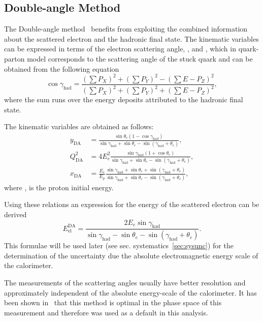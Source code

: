 \subsection{Double-angle Method}
\label{subsec:da}
The Double-angle method~\cite{proc:hera:1991:23} benefits from exploiting the combined information about the scattered electron and the hadronic final state. The kinematic variables can be expressed in terms of the electron scattering angle, \thetae, and \gamha, which in quark-parton model corresponds to the scattering angle of the stuck quark and can be obtained from the following equation
\begin{equation}
\cos \gamma_{\text{had}} = \frac{ \left( \sum{P_{X}} \right)^2 + \left( \sum{P_{Y}} \right)^2 - (\sum{E - P_{Z}})^2 }{\left( \sum{P_{X}} \right)^2 + \left( \sum{P_{Y}} \right)^2 + (\sum{E - P_{Z}})^2},
\label{eq:cosgam}
\end{equation}
where the sum runs over the energy deposits attributed to the hadronic final state.

The kinematic variables are obtained as follows:
\begin{align}
	y_\text{DA}      &= \frac{ \sin \theta_e \left( 1 - \cos \gamma_\text{had} \right)}{ \sin \gamma_\text{had} + \sin \theta_e - \sin \left( \gamma_\text{had} + \theta_e \right) },			\label{eq:yda} \\
	Q^2_\text{DA} &= 4E_e^2\frac{ \sin \gamma_\text{had} \left( 1 + \cos \theta_e \right) }{ \sin \gamma_\text{had} + \sin \theta_e - \sin \left( \gamma_\text{had} + \theta_e \right) },			\label{eq:q2da}							\\
	x_\text{DA}      &= \frac{E_e}{E_p} \frac{\sin \gamma_\text{had} + \sin \theta_e + \sin \left( \gamma_\text{had} + \theta_e \right)}{\sin \gamma_\text{had} + \sin \theta_e - \sin \left( \gamma_\text{had} + \theta_e \right)},			\label{eq:xda}
\end{align}
where \epini, is the proton initial energy.

Using these relations an expression for the energy of the scattered electron can be derived
\begin{equation}
E_\text{el}^\text{DA} = \frac{2E_e \sin \gamma_\text{had}}{\sin \gamma_\text{had} - \sin \theta_e - \sin \left( \gamma_\text{had} + \theta_e \right)}.
\label{eq:eeda}
\end{equation}
This formulae will be used later (see sec. systematics~\ref{sec:sysunc}) for the determination of the uncertainty due the absolute electromagnetic energy scale of the calorimeter.

 The measurements of the scattering angles usually have better resolution and approximately independent of the absolute energy-scale of the calorimeter. It has been shown in~\cite{thesis:behr:2010} that this method is optimal in the phase space of this measurement and therefore was used as a default in this analysis.

